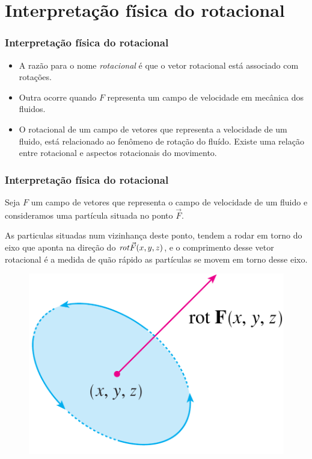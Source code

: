 \section{Interpretação física do rotacional}
\begin{frame}
    \frametitle{Interpretação física do rotacional}
    \begin{itemize}
        \item A razão para o nome \textit{rotacional} é que o vetor rotacional está associado com rotações.
        \item Outra ocorre quando $F$ representa um campo de velocidade em mecânica dos fluidos.
        \item O rotacional de um campo de vetores que representa a velocidade de um fluido, está relacionado ao fenômeno de rotação do fluído. Existe uma relação entre rotacional e aspectos rotacionais do movimento.
    \end{itemize}
\end{frame}

\begin{frame}
    \frametitle{Interpretação física do rotacional}
    Seja $F$ um campo de vetores que representa o campo de velocidade de um fluido e consideramos uma partícula situada no ponto $\vec{F}$.
    \vspace{3mm}
    
    As particulas situadas num vizinhança deste ponto, tendem a rodar em torno do eixo que aponta na direção do $\text{\textit{rot}} \vec{F}(x,y,z)$, e o comprimento desse vetor rotacional é a medida de quão rápido as partículas se movem em torno desse eixo.
    
    \begin{figure}[h]
        \centering
        \includegraphics[scale=0.2]{img/rotacional.png}
    \end{figure}
\end{frame}

